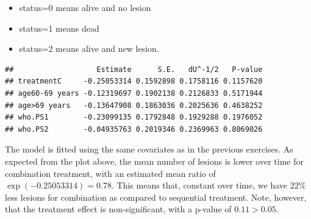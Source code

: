 \documentclass[
  11pt,
]{article}
\newenvironment{Shaded}{\begin{snugshade}}{\end{snugshade}}
\newcommand{\AttributeTok}[1]{\textcolor[rgb]{0.77,0.63,0.00}{#1}}
\newcommand{\CommentTok}[1]{\textcolor[rgb]{0.56,0.35,0.01}{\textit{#1}}}
\newcommand{\DecValTok}[1]{\textcolor[rgb]{0.00,0.00,0.81}{#1}}
\newcommand{\ErrorTok}[1]{\textcolor[rgb]{0.64,0.00,0.00}{\textbf{#1}}}
\newcommand{\FunctionTok}[1]{\textcolor[rgb]{0.00,0.00,0.00}{#1}}
\newcommand{\NormalTok}[1]{#1}
\newcommand{\OtherTok}[1]{\textcolor[rgb]{0.56,0.35,0.01}{#1}}
\newcommand{\SpecialCharTok}[1]{\textcolor[rgb]{0.00,0.00,0.00}{#1}}
\providecommand{\tightlist}{%
  \setlength{\itemsep}{0pt}\setlength{\parskip}{0pt}}
\begin{document}
\begin{itemize}
\tightlist
\item
  status=0 means alive and no lesion
\item
  status=1 means dead
\item
  status=2 means alive and new lesion.
\end{itemize}

\begin{Shaded}
\end{Shaded}

\begin{verbatim}
##                   Estimate      S.E.   dU^-1/2   P-value
## treatmentC     -0.25053314 0.1592898 0.1758116 0.1157620
## age60-69 years -0.12319697 0.1902138 0.2126833 0.5171944
## age>69 years   -0.13647908 0.1863036 0.2025636 0.4638252
## who.PS1        -0.23099135 0.1792848 0.1929288 0.1976052
## who.PS2        -0.04935763 0.2019346 0.2369963 0.8069026
\end{verbatim}

The model is fitted using the same covariates as in the previous
exercises. As expected from the plot above, the mean number of lesions
is lower over time for combination treatment, with an estimated mean
ratio of \(\exp(-0.25053314)=0.78\). This means that, constant over
time, we have \(22\%\) less lesions for combination as compared to
sequential treatment. Note, however, that the treatment effect is
non-significant, with a p-value of \(0.11 > 0.05\).
\end{document}
